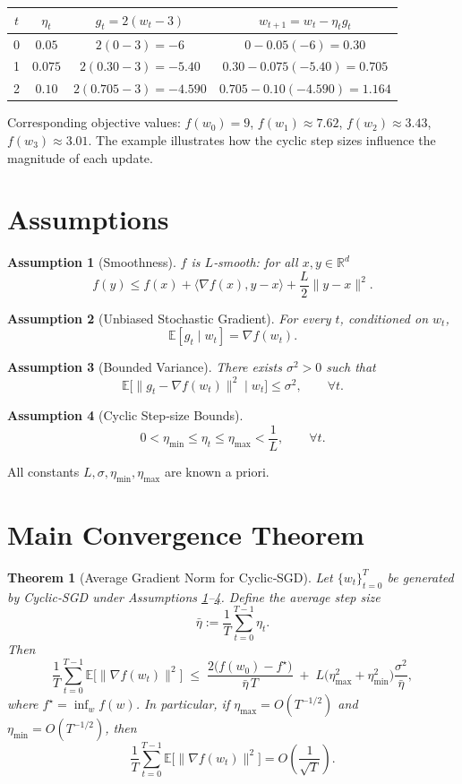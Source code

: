 \documentclass{article}
\newtheorem{theorem}{Theorem}
\newtheorem{assumption}{Assumption}
\newcommand{\EE}{\mathbb{E}}
\newcommand{\RR}{\mathbb{R}}
\begin{document}
\begin{center}
\begin{tabular}{c|c|c|c}
$t$ & $\eta_{t}$ & $g_{t}=2(w_{t}-3)$ & $w_{t+1}=w_{t}-\eta_{t}g_{t}$ \\ \hline
0 & $0.05$ & $2(0-3)=-6$ & $0-0.05(-6)=0.30$ \\
1 & $0.075$ & $2(0.30-3)=-5.40$ & $0.30-0.075(-5.40)=0.705$ \\
2 & $0.10$ & $2(0.705-3)=-4.590$ & $0.705-0.10(-4.590)=1.164$ \\
\end{tabular}
\end{center}
Corresponding objective values:
$f(w_{0})=9$, $f(w_{1})\approx7.62$, $f(w_{2})\approx3.43$, $f(w_{3})\approx3.01$.
The example illustrates how the cyclic step sizes influence the magnitude of each update.

\newpage

\section*{Assumptions}
\begin{assumption}[Smoothness]\label{ass:smooth}
$f$ is $L$‑smooth: for all $x,y\in\RR^{d}$
\[
f(y)\le f(x)+\langle \nabla f(x),y-x\rangle+\frac{L}{2}\|y-x\|^{2}.
\tag{A1}
\]
\end{assumption}
\begin{assumption}[Unbiased Stochastic Gradient]\label{ass:unbiased}
For every $t$, conditioned on $w_{t}$,
\[
\EE[g_{t}\mid w_{t}]=\nabla f(w_{t}).
\tag{A2}
\]
\end{assumption}
\begin{assumption}[Bounded Variance]\label{ass:variance}
There exists $\sigma^{2}>0$ such that
\[
\EE\big[\|g_{t}-\nabla f(w_{t})\|^{2}\mid w_{t}\big]\le\sigma^{2},
\qquad\forall t.
\tag{A3}
\]
\end{assumption}
\begin{assumption}[Cyclic Step‑size Bounds]\label{ass:step}
\[
0<\eta_{\min}\le \eta_{t}\le\eta_{\max}<\frac{1}{L},
\qquad\forall t.
\tag{A4}
\]
\end{assumption}
All constants $L,\sigma,\eta_{\min},\eta_{\max}$ are known a priori.

\section*{Main Convergence Theorem}
\begin{theorem}[Average Gradient Norm for Cyclic‑SGD]\label{thm:main}
Let $\{w_{t}\}_{t=0}^{T}$ be generated by Cyclic‑SGD under Assumptions \ref{ass:smooth}–\ref{ass:step}.
Define the average step size
\[
\bar\eta:=\frac{1}{T}\sum_{t=0}^{T-1}\eta_{t}.
\]
Then
\[
\frac{1}{T}\sum_{t=0}^{T-1}\EE\big[\|\nabla f(w_{t})\|^{2}\big]
\;\le\;
\frac{2\big(f(w_{0})-f^{\star}\big)}{\bar\eta\,T}
\;+\;
L\big(\eta_{\max}^{2}+\eta_{\min}^{2}\big)\frac{\sigma^{2}}{\bar\eta},
\tag{3}
\]
where $f^{\star}=\inf_{w}f(w)$. In particular, if $\eta_{\max}=O(T^{-1/2})$ and $\eta_{\min}=O(T^{-1/2})$, then
\[
\frac{1}{T}\sum_{t=0}^{T-1}\EE\big[\|\nabla f(w_{t})\|^{2}\big]=O\!\left(\frac{1}{\sqrt{T}}\right).
\]
\end{theorem}
\end{document}
